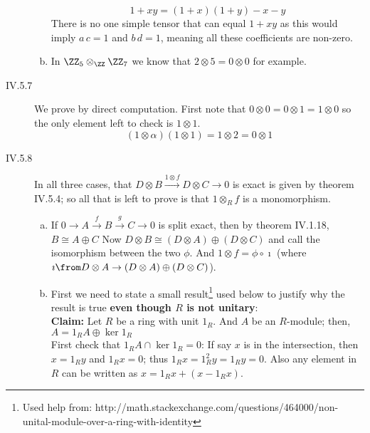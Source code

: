 \begin{description}
\begin{enumerate}[(a)]
            $$1+xy= (1+x)(1+y) - x - y$$
            There is no one simple tensor that can equal $1+xy$ as this would imply $a\,c=1$ and $b\,d=1$, meaning all these coefficients are non-zero.
        \item In $\ZZ_5\otimes_\ZZ \ZZ_7$ we know that $2\otimes 5=0\otimes 0$ for example.
    \end{enumerate}
\item[IV.5.7] We prove by direct computation. First note that $0\otimes 0 = 0\otimes 1 = 1\otimes 0$ so the only element left to check is $1\otimes 1$.
    $$(1\otimes\alpha)(1\otimes 1) = 1\otimes 2 = 0\otimes 1$$
\item[IV.5.8]
    In all three cases, that $D\otimes B \xrightarrow{1\otimes f} D\otimes C \to 0$ is exact is given by theorem IV.5.4; so all that is left to prove is that $1\otimes_R f$ is a monomorphism.
    \begin{enumerate}[(a)]
        \item If $0\to A \xrightarrow{f} B\xrightarrow{g} C \to 0$ is split exact, then by theorem IV.1.18, $B\cong A\oplus C$  Now $D\otimes B\cong (D\otimes A)\oplus(D\otimes C)$ and call the isomorphism between the two $\phi$. And $1\otimes f = \phi \circ \imath$ (where $\imath\from D\otimes A \to (D\otimes A)\oplus (D\otimes C)$).
        \item First we need to state a small result\footnote{Used help from: http://math.stackexchange.com/questions/464000/non-unital-module-over-a-ring-with-identity} used below to justify why the result is true \textbf{even though $R$ is not unitary}: \\
            \textbf{Claim:} Let $R$ be a ring with unit $1_R$. And $A$ be an $R$-module; then, $A=1_RA\oplus \ker 1_R$\\
            First check that $1_RA\cap \ker 1_R= 0$: If say $x$ is in the intersection, then $x=1_Ry$ and $1_Rx=0$; thus $1_Rx=1_R^2y=1_Ry =0$. Also any element in $R$ can be written as $x=1_Rx + (x-1_Rx)$.


\end{enumerate}
\end{description}
